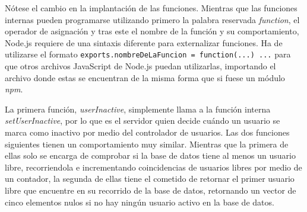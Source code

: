 
Nótese el cambio en la implantación de las funciones. Mientras que las funciones internas pueden programarse utilizando primero la palabra reservada \emph{function}, el operador de asignación y tras este el nombre de la función y su comportamiento, Node.js requiere de una sintaxis diferente para externalizar funciones. Ha de utilizarse el formato \texttt{exports.nombreDeLaFuncion = function(...) {...}} para que otros archivos JavaScript de Node.js puedan utilizarlas, importando el archivo donde estas se encuentran de la misma forma que si fuese un módulo \emph{npm}.

La primera función, \emph{userInactive}, simplemente llama a la función interna \emph{setUserInactive}, por lo que es el servidor quien decide cuándo un usuario se marca como inactivo por medio del controlador de usuarios. Las dos funciones siguientes tienen un comportamiento muy similar. Mientras que la primera de ellas solo se encarga de comprobar si la base de datos tiene al menos un usuario libre, recorriendola e incrementando coincidencias de usuarios libres por medio de un contador, la segunda de ellas tiene el cometido de retornar el primer usuario libre que encuentre en su recorrido de la base de datos, retornando un vector de cinco elementos nulos si no hay ningún usuario activo en la base de datos.

